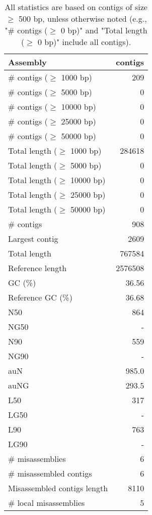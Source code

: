 \documentclass[12pt,a4paper]{article}
\begin{document}
\begin{table}[ht]
\begin{center}
\caption{All statistics are based on contigs of size $\geq$ 500 bp, unless otherwise noted (e.g., "\# contigs ($\geq$ 0 bp)" and "Total length ($\geq$ 0 bp)" include all contigs).}
\begin{tabular}{|l*{1}{|r}|}
\hline
Assembly & contigs \\ \hline
\# contigs ($\geq$ 1000 bp) & 209 \\ \hline
\# contigs ($\geq$ 5000 bp) & 0 \\ \hline
\# contigs ($\geq$ 10000 bp) & 0 \\ \hline
\# contigs ($\geq$ 25000 bp) & 0 \\ \hline
\# contigs ($\geq$ 50000 bp) & 0 \\ \hline
Total length ($\geq$ 1000 bp) & 284618 \\ \hline
Total length ($\geq$ 5000 bp) & 0 \\ \hline
Total length ($\geq$ 10000 bp) & 0 \\ \hline
Total length ($\geq$ 25000 bp) & 0 \\ \hline
Total length ($\geq$ 50000 bp) & 0 \\ \hline
\# contigs & 908 \\ \hline
Largest contig & 2609 \\ \hline
Total length & 767584 \\ \hline
Reference length & 2576508 \\ \hline
GC (\%) & 36.56 \\ \hline
Reference GC (\%) & 36.68 \\ \hline
N50 & 864 \\ \hline
NG50 & - \\ \hline
N90 & 559 \\ \hline
NG90 & - \\ \hline
auN & 985.0 \\ \hline
auNG & 293.5 \\ \hline
L50 & 317 \\ \hline
LG50 & - \\ \hline
L90 & 763 \\ \hline
LG90 & - \\ \hline
\# misassemblies & 6 \\ \hline
\# misassembled contigs & 6 \\ \hline
Misassembled contigs length & 8110 \\ \hline
\# local misassemblies & 5 \\ \hline

\end{tabular}
\end{center}
\end{table}
\end{document}
